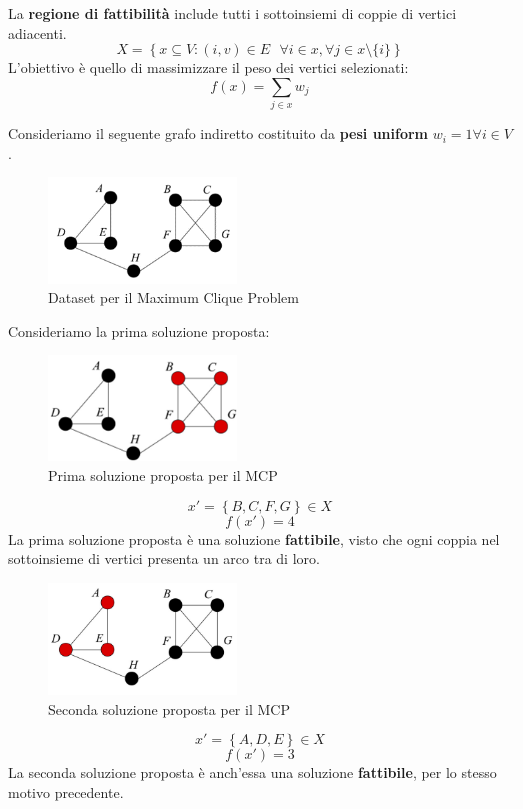 \documentclass{article}
\begin{document}
La \textbf{regione di fattibilità} include tutti i sottoinsiemi di coppie di vertici adiacenti.
$$X=\left\{x\subseteq V:(i,v)\in E \text{ }\forall i \in x, \forall j \in x \setminus \{i\}\right\}$$
L'obiettivo è quello di massimizzare il peso dei vertici selezionati:
$$f(x)=\sum_{j\in x}w_j$$

Consideriamo il seguente grafo indiretto costituito da \textbf{pesi uniform} $w_i=1 \forall i\in V$.
\begin{figure}[H]
    \centering
    \includegraphics[width=5cm]{images/MCP_dataset.png}
    \caption{Dataset per il Maximum Clique Problem}
    \label{fig:MCP_dataset}
\end{figure}
Consideriamo la prima soluzione proposta:
\begin{figure}[H]
    \centering
    \includegraphics[width=5cm]{images/MCP_sol1.png}
    \caption{Prima soluzione proposta per il MCP}
    \label{fig:MCP_sol1}
\end{figure}
$$x'=\left\{B,C,F,G\right\}\in X$$
$$f(x')=4$$
La prima soluzione proposta è una soluzione \textbf{fattibile}, visto che ogni coppia nel sottoinsieme di vertici
presenta un arco tra di loro.
\begin{figure}[H]
    \centering
    \includegraphics[width=5cm]{images/MCP_sol2.png}
    \caption{Seconda soluzione proposta per il MCP}
    \label{fig:MCP_sol2}
\end{figure}

$$x'=\left\{A,D,E\right\}\in X$$
$$f(x')=3$$
La seconda soluzione proposta è anch'essa una soluzione \textbf{fattibile}, per lo stesso motivo precedente.
\end{document}
